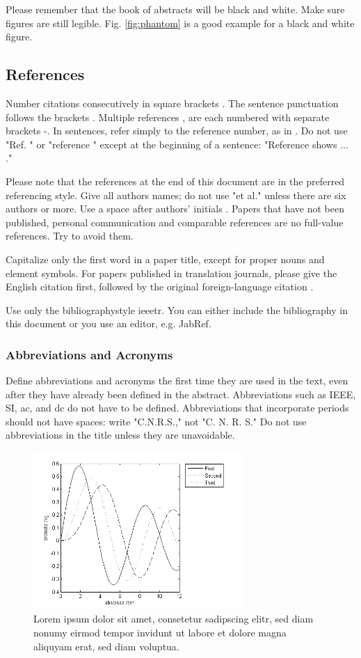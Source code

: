 \documentclass[10pt,a4paper,oneside,twocolumn]{article}
\begin{document}
Please remember that the book of abstracts will be black and white. Make sure figures are still legible. Fig. \ref{fig:phantom} is a good example for a black and white figure.

\subsection{References}
Number citations consecutively in square brackets \cite{Kopka}. The sentence punctuation follows the brackets \cite{BMT}. Multiple references \cite {Young}, \cite{Kaethner} are each numbered with separate brackets \cite{BMT}-\cite{Zongker}. In sentences, refer simply to the reference number, as in \cite{Kopka}. Do not use "Ref. \cite{BMT}" or "reference \cite{Young}" except at the beginning of a sentence: "Reference \cite{Kaethner} shows ... ." 

Please note that the references at the end of this document are in the preferred referencing style. Give all authors names; do not use "et al." unless there are six authors or more. Use a space after authors' initials \cite{Zongker}. Papers that have not been published, personal communication and comparable references are no full-value references. Try to avoid them. 

Capitalize only the first word in a paper title, except for proper nouns and element symbols. For papers published in translation journals, please give the English citation first, followed by the original foreign-language citation \cite{Kopka}.

Use only the bibliographystyle ieeetr. You can either include the bibliography in this document or you use an editor, e.g. JabRef.

\subsubsection{Abbreviations and Acronyms}
Define abbreviations and acronyms the first time they are used in the text, even after they have already been defined in the abstract. Abbreviations such as IEEE, SI, ac, and dc do not have to be defined. Abbreviations that incorporate periods should not have spaces: write "C.N.R.S.," not "C. N. R. S." Do not use abbreviations in the title unless they are unavoidable.

\begin{figure}[!h]
\centering
\includegraphics[width=8cm]{fig3.png}
\caption{Lorem ipsum dolor sit amet, consetetur sadipscing elitr, sed diam nonumy eirmod tempor invidunt ut labore et dolore magna aliquyam erat, sed diam voluptua.}
\label{fig:graph}
\end{figure}
\end{document}
